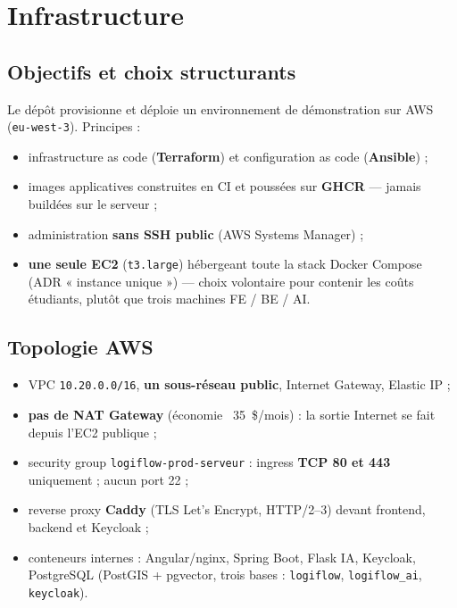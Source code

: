 \chapter{Infrastructure}
\label{chap:infra}

\section{Objectifs et choix structurants}

Le dépôt  provisionne et déploie un environnement de démonstration sur AWS
(\texttt{eu-west-3}). Principes :

\begin{itemize}[leftmargin=*]
  \item infrastructure as code (\textbf{Terraform}) et configuration as code (\textbf{Ansible}) ;
  \item images applicatives construites en CI et poussées sur \textbf{GHCR} --- jamais buildées sur le serveur ;
  \item administration \textbf{sans SSH public} (AWS Systems Manager) \cite{awsssm} ;
  \item \textbf{une seule EC2} (\texttt{t3.large}) hébergeant toute la stack Docker Compose
        (ADR « instance unique ») --- choix volontaire pour contenir les coûts étudiants,
        plutôt que trois machines FE / BE / AI.
\end{itemize}

\section{Topologie AWS}

\begin{itemize}[leftmargin=*]
  \item VPC \texttt{10.20.0.0/16}, \textbf{un sous-réseau public}, Internet Gateway, Elastic IP ;
  \item \textbf{pas de NAT Gateway} (économie ~35~\$/mois) : la sortie Internet se fait depuis l'EC2 publique ;
  \item security group \texttt{logiflow-prod-serveur} : ingress \textbf{TCP 80 et 443} uniquement ;
        aucun port 22 ;
  \item reverse proxy \textbf{Caddy} (TLS Let's Encrypt, HTTP/2--3) devant frontend, backend et Keycloak ;
  \item conteneurs internes : Angular/nginx, Spring Boot, Flask IA, Keycloak, PostgreSQL
        (PostGIS + pgvector, trois bases : \texttt{logiflow}, \texttt{logiflow\_ai}, \texttt{keycloak}).
\end{itemize}

